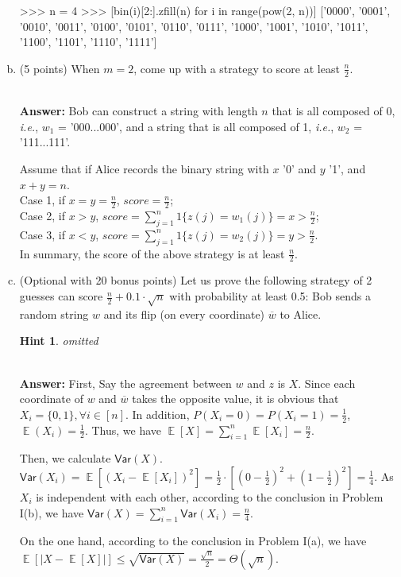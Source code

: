 \documentclass[12pt]{article}
\newcommand{\Answer}{\ \\ \textbf{Answer:} }
\newtheorem{hint}{Hint}
\DeclareMathOperator*{\E}{\mathbb{E}}
\newcommand{\Var}{\mathsf{Var}}
\def\ie{\textit{i.e.}\xspace}
\begin{document}
\begin{problem}
\begin{enumerate}[(a)]
\begin{python}
>>> n = 4
>>> [bin(i)[2:].zfill(n) for i in range(pow(2, n))]
['0000', '0001', '0010', '0011', '0100', '0101', '0110', '0111', '1000',
'1001', '1010', '1011', '1100', '1101', '1110', '1111']
\end{python}


\item (5 points) When $m = 2$, come up with a strategy to score at least $\frac{n}{2}$.

\Answer
Bob can construct a string with length $n$ that is all composed of 0, \ie, $w_1$ = '000...000', and a string that is all composed of 1, \ie, $w_2$ = '111...111'.

Assume that if Alice records the binary string with $x$ '0' and $y$ '1', and $x + y = n$. \\
Case 1, if $x = y = \frac{n}{2}$, $score = \frac{n}{2}$; \\
Case 2, if $x > y$, $score = \sum_{j=1}^{n}{1\{z(j) = w_1(j)\}} = x > \frac{n}{2}$; \\
Case 3, if $x < y$, $score = \sum_{j=1}^{n}{1\{z(j) = w_2(j)\}} = y > \frac{n}{2}$. \\
In summary, the score of the above strategy is at least $\frac{n}{2}$.


\item (Optional with 20 bonus points) Let us prove the following strategy of 2 guesses can score $\frac{n}{2} + 0.1 \cdot \sqrt{n}$ with probability at least 0.5:
Bob sends a random string $w$ and its flip (on every coordinate) $\overline w$ to Alice.

\begin{hint}
omitted
\end{hint}

\Answer
First, Say the agreement between $w$ and $z$ is $X$. 
Since each coordinate of $w$ and $\overline w$ takes the opposite value, it is obvious that $X_i = \{0, 1\}, \forall i \in [n]$. 
In addition, $P(X_i = 0) = P(X_i = 1) = \frac{1}{2}$, $\E(X_i) = \frac{1}{2}$.
Thus, we have $\E[X] = \sum_{i=1}^{n}\E[X_i] = \frac{n}{2}$.

Then, we calculate $\Var(X)$. $\Var(X_i) = \E[(X_i - \E[X_i])^2] = \frac{1}{2} \cdot [(0 - \frac{1}{2})^2 + (1 - \frac{1}{2})^2] = \frac{1}{4}$.
As $X_i$ is independent with each other, according to the conclusion in Problem I(b), we have $\Var(X) = \sum_{i=1}^{n}\Var(X_i) = \frac{n}{4}$.

On the one hand, according to the conclusion in Problem I(a), we have $\E[|X - \E[X]|] \le \sqrt{\Var(X)} = \frac{\sqrt{n}}{2} = \Theta(\sqrt{n})$.


\end{enumerate}
\end{problem}
\end{document}
